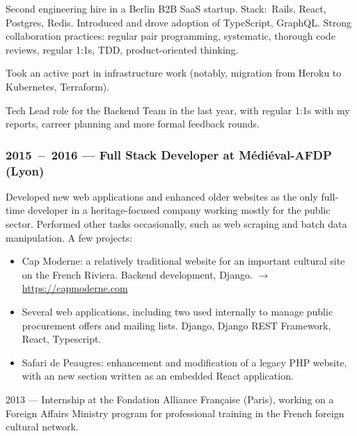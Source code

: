 \documentclass[10pt]{article}
\begin{document}
\begin{minipage}[t]{0.54\textwidth}
    \vspace{-0.8em}

    Second engineering hire in a Berlin B2B SaaS startup. Stack:~Rails, React,
    Postgres, Redis. Introduced and drove adoption of
    TypeScript, GraphQL. Strong collaboration practices: regular pair programming, systematic, thorough code reviews, regular 1:1s, TDD, product-oriented thinking.

    Took an active part in infrastructure work (notably, migration from Heroku
    to Kubernetes, Terraform).

    Tech Lead role for the Backend Team in the last year, with regular 1:1s with
    my reports, carreer planning and more formal feedback rounds.

    \vspace{-0.5em}

    \subsubsection*{2015~--~2016 --- Full Stack Developer at Médiéval-AFDP (Lyon)}

    \vspace{-0.8em}

    Developed new web applications and enhanced older websites as the only
    full-time developer in a heritage-focused company working mostly for
    the public sector. Performed other tasks occasionally, such as web
    scraping and batch data manipulation. A few projects:
    \begin{itemize}
    \item
      Cap Moderne: a relatively traditional website for an important cultural site
      on the French Riviera. Backend development, Django. $\rightarrow$ \url{https://capmoderne.com}
    \item
      Several web applications, including two used internally to manage public
      procurement offers and mailing lists. Django, Django REST Framework,
      React, Typescript.
    \item
      Safari de Peaugres: enhancement and modification of a legacy PHP website,
      with an new section written as an embedded React application.
    \end{itemize}

  2013 --- Internship at the Fondation Alliance Française (Paris), working on a
  Foreign Affairs Ministry program for professional training in the French
  foreign cultural network.
\end{minipage}
\end{document}
